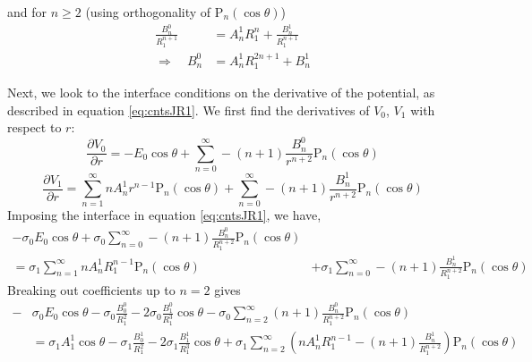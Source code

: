 and for $n\geq 2$ (using orthogonality of $\text{P}_n(\cos\theta)$)
    \begin{equation}
    \begin{split}
        \frac{B_n^0}{R_1^{n+1}} &= A_n^1 R_1^n + \frac{B_n^1}{R_1^{n+1}} \\
        \Rightarrow \quad
        B_n^0 &= A_n^1 R_1^{2n+1} + B_n^1
        \end{split}
        \label{eq:coeff3}
    \end{equation}

Next, we look to the interface conditions on the derivative of the potential, as described in equation \ref{eq:cntsJR1}. We first find the derivatives of $V_0$, $V_1$ with respect to $r$:
    \begin{equation}
        \frac{\partial V_0}{\partial r} = -E_0\cos\theta + \sum_{n=0}^{\infty}-(n+1)\frac{B_n^0}{r^{n+2}}\text{P}_n(\cos\theta)
        \label{eq:dV0dr}
    \end{equation}
    \begin{equation}
        \frac{\partial V_1}{\partial r} = \sum_{n=1}^{\infty}n A_n^{1}r^{n-1}\text{P}_n(\cos\theta) + \sum_{n=0}^{\infty}-(n+1)\frac{B_n^1}{r^{n+2}}\text{P}_n(\cos\theta)
        \label{eq:dV1dr}
    \end{equation}
Imposing the interface in equation \ref{eq:cntsJR1}, we have,
    \begin{displaymath}
        \begin{split}
            -\sigma_0 E_0\cos\theta + \sigma_0 \sum_{n=0}^{\infty}-(n+1)\frac{B_n^0}{R_1^{n+2}}\text{P}_n(\cos\theta)& \\
            = \sigma_1 \sum_{n=1}^{\infty}n A_n^{1}R_1^{n-1}\text{P}_n(\cos\theta) & + \sigma_1 \sum_{n=0}^{\infty}-(n+1)\frac{B_n^1}{R_1^{n+2}}\text{P}_n(\cos\theta)
        \end{split}
    \end{displaymath}
Breaking out coefficients up to $n = 2$ gives
    \begin{displaymath}
        \begin{split}
            - &\sigma_0 E_0\cos\theta
            - \sigma_0 \frac{B_0^0}{R_1^{2}}
            - 2 \sigma_0 \frac{B_1^0}{R_1^{3}}\cos\theta
            - \sigma_0 \sum_{n=2}^{\infty}(n+1)\frac{B_n^0}{R_1^{n+2}}\text{P}_n(\cos\theta) \\
            &= \sigma_1 A_1^1\cos\theta
            - \sigma_1 \frac{B_0^1}{R_1^{2}}
            - 2 \sigma_1 \frac{B_1^1}{R_1^{3}}\cos\theta
            + \sigma_1 \sum_{n=2}^{\infty}\left(nA_n^1R_1^{n-1}-(n+1)\frac{B_n^1}{R_1^{n+2}}\right)\text{P}_n(\cos\theta)
        \end{split}
    \end{displaymath}
